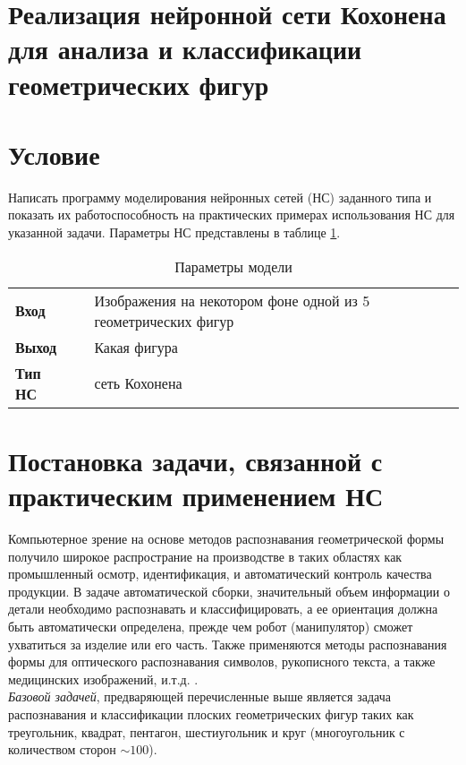 \documentclass[12pt,a4paper]{article}
\begin{document}
\section*{\Large\center Реализация нейронной сети Кохонена
для анализа и классификации геометрических фигур}    
\section*{Условие}
\noindent
Написать программу моделирования нейронных сетей (НС) 
заданного типа и показать их работоспособность на практических примерах использования НС для указанной задачи.
Параметры НС представлены в таблице \ref{tbl:01}.

\begin{table}[h]
	\center
	\caption{Параметры модели \label{tbl:01}}
\begin{tabular}{lc|l}
\textbf{Вход} & & Изображения на некотором фоне одной из 5 геометрических фигур \\
\textbf{Выход} & & Какая фигура \\
\textbf{Тип НС} & & сеть Кохонена \\
\end{tabular}
\end{table}

\section{Постановка задачи, связанной с практическим \newline применением НС}
Компьютерное зрение на основе методов распознавания геометрической 
формы получило широкое распространие на производстве в таких областях 
как промышленный осмотр, идентификация, и автоматический контроль
качества продукции. 
В задаче автоматической сборки, значительный объем информации о детали
необходимо распознавать и классифицировать, а ее ориентация должна быть 
автоматически определена, прежде чем робот (манипулятор) сможет ухватиться 
за изделие или его часть. 
Также применяются методы распознавания формы
для оптического распознавания символов, рукописного текста,
а также медицинских изображений, и.т.д. \cite{hou1999}.\\[6pt]
\noindent
\emph{Базовой задачей}, предваряющей перечисленные выше является
задача распознавания и классификации плоских геометрических фигур
таких как треугольник, квадрат, пентагон, шестиугольник и круг 
(многоугольник с количеством сторон $\sim100$).
\end{document}
